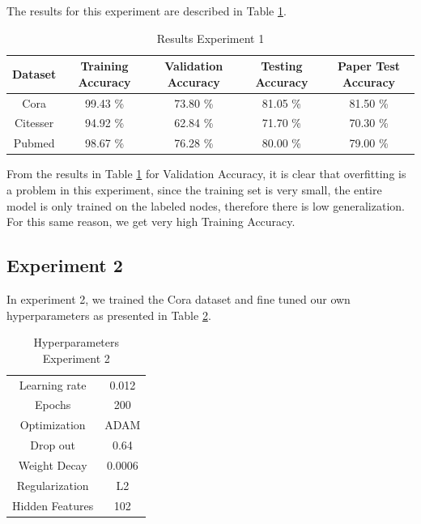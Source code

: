  The results for this experiment are described in Table \ref{tab:results1}.

\begin {table}[ht]
\caption {Results Experiment 1} \label{tab:results1} 
  \begin{center}
    \begin{tabular}{|c|c|c|c|c|}
    \hline
    Dataset    &  Training Accuracy & Validation Accuracy & Testing Accuracy & Paper Test Accuracy \\ \hline
    Cora          & 99.43 \% & 73.80 \%  & 81.05 \% & 81.50 \% \\ 
    Citesser      & 94.92 \% & 62.84 \%  & 71.70 \% & 70.30 \% \\
    Pubmed        & 98.67 \% & 76.28 \%  & 80.00 \% & 79.00 \% \\
    \hline
    \end{tabular}
  \end{center}
\end{table}

From the results in Table \ref{tab:results1} for Validation Accuracy, it is clear that overfitting is a problem in this experiment, since the training set is very small, the entire model is only trained on the labeled nodes, therefore there is low generalization. For this same reason, we get very high Training Accuracy. 

\subsection{Experiment 2}
In experiment 2, we trained the Cora dataset and fine tuned our own hyperparameters as presented in Table \ref{tab:hyperparameters2}.

\begin {table}[ht]
\caption {Hyperparameters Experiment 2} \label{tab:hyperparameters2} 
  \begin{center}
    \begin{tabular}{|c|c|}
    \hline
    Learning rate     & 0.012 \\ 
    Epochs            & 200  \\ 
    Optimization      & ADAM \\
    Drop out          & 0.64   \\
    Weight Decay      & 0.0006 \\
    Regularization    & L2    \\
    Hidden Features   & 102   \\
    \hline
    \end{tabular}
  \end{center}
\end{table}


